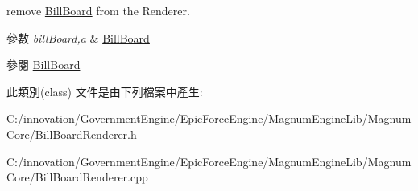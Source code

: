 remove \hyperlink{class_i_dream_sky_1_1_bill_board}{Bill\+Board} from the Renderer. 


\begin{DoxyParams}{參數}
{\em bill\+Board,a} & \hyperlink{class_i_dream_sky_1_1_bill_board}{Bill\+Board} \\
\hline
\end{DoxyParams}
\begin{DoxySeeAlso}{參閱}
\hyperlink{class_i_dream_sky_1_1_bill_board}{Bill\+Board} 
\end{DoxySeeAlso}


此類別(class) 文件是由下列檔案中產生\+:\begin{DoxyCompactItemize}
\item 
C\+:/innovation/\+Government\+Engine/\+Epic\+Force\+Engine/\+Magnum\+Engine\+Lib/\+Magnum\+Core/Bill\+Board\+Renderer.\+h\item 
C\+:/innovation/\+Government\+Engine/\+Epic\+Force\+Engine/\+Magnum\+Engine\+Lib/\+Magnum\+Core/Bill\+Board\+Renderer.\+cpp\end{DoxyCompactItemize}
